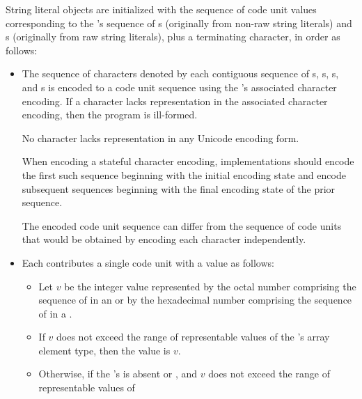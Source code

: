 \pnum
{}%
%
String literal objects are initialized with
the sequence of code unit values
corresponding to the 's sequence of
s (originally from non-raw string literals) and
s (originally from raw string literals),
plus a terminating  character,
in order as follows:
\begin{itemize}
\item
The sequence of characters denoted by each contiguous sequence of
s,
s,
s, and
s
is encoded to a code unit sequence
using the 's associated character encoding.
If a character lacks representation in the associated character encoding,
then the program is ill-formed.
\begin{note}
No character lacks representation in any Unicode encoding form.
\end{note}
When encoding a stateful character encoding,
implementations should encode the first such sequence
beginning with the initial encoding state and
encode subsequent sequences
beginning with the final encoding state of the prior sequence.
\begin{note}
The encoded code unit sequence can differ from
the sequence of code units that would be obtained by
encoding each character independently.
\end{note}
\item
Each 
contributes a single code unit with a value as follows:
\begin{itemize}
\item
Let $v$ be the integer value represented by
the octal number comprising
the sequence of  in
an  or by
the hexadecimal number comprising
the sequence of  in
a .
\item
If $v$ does not exceed the range of representable values of
the 's array element type,
then the value is $v$.
\item
Otherwise,
if the 's 
is absent or , and
$v$ does not exceed the range of representable values of

\end{itemize}
\end{itemize}
